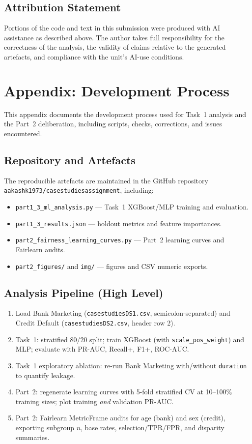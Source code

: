 \subsection{Attribution Statement}
Portions of the code and text in this submission were produced with AI assistance as
described above. The author takes full responsibility for the correctness of the
analysis, the validity of claims relative to the generated artefacts, and compliance
with the unit's AI-use conditions.


\newpage
\section{Appendix: Development Process}
\label{sec:appendix-process}

This appendix documents the development process used for Task~1 analysis and the
Part~2 deliberation, including scripts, checks, corrections, and issues encountered.

\subsection{Repository and Artefacts}
The reproducible artefacts are maintained in the GitHub repository
\texttt{aakashk1973/casestudiesassignment}, including:
\begin{itemize}
    \item \texttt{part1\_3\_ml\_analysis.py} --- Task~1 XGBoost/MLP training and evaluation.
    \item \texttt{part1\_3\_results.json} --- holdout metrics and feature importances.
    \item \texttt{part2\_fairness\_learning\_curves.py} --- Part~2 learning curves and
    Fairlearn audits.
    \item \texttt{part2\_figures/} and \texttt{img/} --- figures and CSV numeric exports.
\end{itemize}

\subsection{Analysis Pipeline (High Level)}
\begin{enumerate}
    \item Load Bank Marketing (\texttt{casestudiesDS1.csv}, semicolon-separated) and
    Credit Default (\texttt{casestudiesDS2.csv}, header row 2).
    \item Task~1: stratified 80/20 split; train XGBoost (with
    \texttt{scale\_pos\_weight}) and MLP; evaluate with PR-AUC, Recall+, F1+, ROC-AUC.
    \item Task~1 exploratory ablation: re-run Bank Marketing with/without
    \texttt{duration} to quantify leakage.
    \item Part~2: regenerate learning curves with 5-fold stratified CV at 10--100\%
    training sizes; plot training \emph{and} validation PR-AUC.
    \item Part~2: Fairlearn MetricFrame audits for age (bank) and sex (credit), exporting
    subgroup $n$, base rates, selection/TPR/FPR, and disparity summaries.
\end{enumerate}

